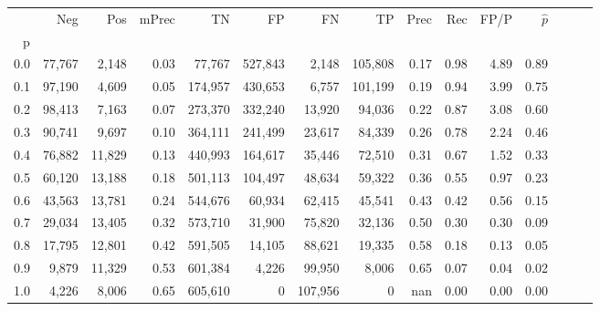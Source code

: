 \begin{tabular}{rrrrrrrrrrrrrrr}
\toprule
{} &     Neg &     Pos & mPrec &       TN &       FP &       FN &       TP &  Prec &   Rec &  FP/P & $\hat{p}$ \\
p   &         &         &       &          &          &          &          &       &       &       &           \\
\midrule
0.0 &  77,767 &   2,148 &  0.03 &   77,767 &  527,843 &    2,148 &  105,808 &  0.17 &  0.98 &  4.89 &      0.89 \\
0.1 &  97,190 &   4,609 &  0.05 &  174,957 &  430,653 &    6,757 &  101,199 &  0.19 &  0.94 &  3.99 &      0.75 \\
0.2 &  98,413 &   7,163 &  0.07 &  273,370 &  332,240 &   13,920 &   94,036 &  0.22 &  0.87 &  3.08 &      0.60 \\
0.3 &  90,741 &   9,697 &  0.10 &  364,111 &  241,499 &   23,617 &   84,339 &  0.26 &  0.78 &  2.24 &      0.46 \\
0.4 &  76,882 &  11,829 &  0.13 &  440,993 &  164,617 &   35,446 &   72,510 &  0.31 &  0.67 &  1.52 &      0.33 \\
0.5 &  60,120 &  13,188 &  0.18 &  501,113 &  104,497 &   48,634 &   59,322 &  0.36 &  0.55 &  0.97 &      0.23 \\
0.6 &  43,563 &  13,781 &  0.24 &  544,676 &   60,934 &   62,415 &   45,541 &  0.43 &  0.42 &  0.56 &      0.15 \\
0.7 &  29,034 &  13,405 &  0.32 &  573,710 &   31,900 &   75,820 &   32,136 &  0.50 &  0.30 &  0.30 &      0.09 \\
0.8 &  17,795 &  12,801 &  0.42 &  591,505 &   14,105 &   88,621 &   19,335 &  0.58 &  0.18 &  0.13 &      0.05 \\
0.9 &   9,879 &  11,329 &  0.53 &  601,384 &    4,226 &   99,950 &    8,006 &  0.65 &  0.07 &  0.04 &      0.02 \\
1.0 &   4,226 &   8,006 &  0.65 &  605,610 &        0 &  107,956 &        0 &   nan &  0.00 &  0.00 &      0.00 \\
\bottomrule
\end{tabular}

